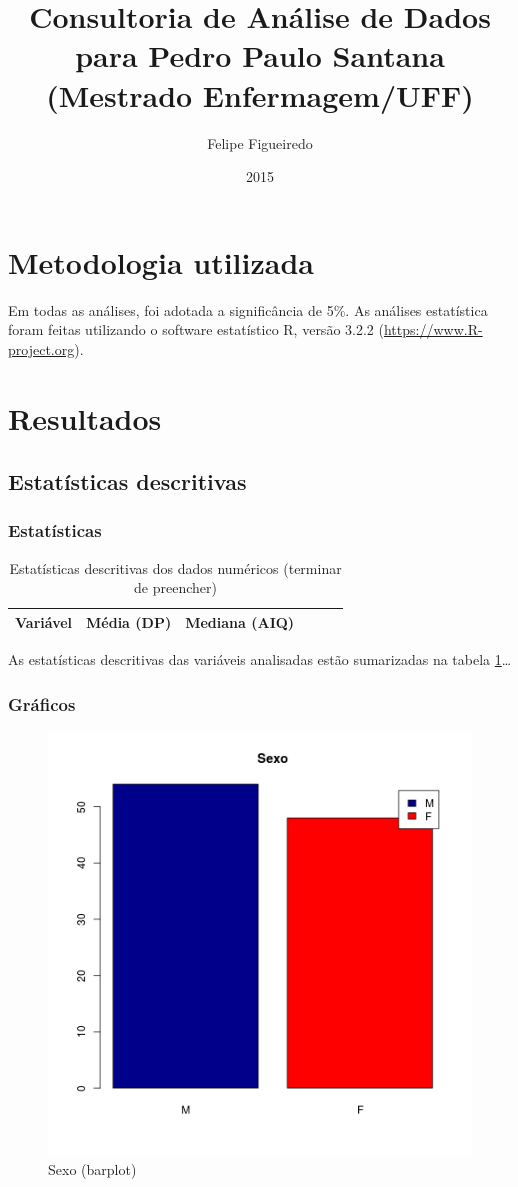 \documentclass[a4paper]{article}
\author{Felipe Figueiredo}
\title{Consultoria de Análise de Dados para Pedro Paulo Santana (Mestrado Enfermagem/UFF)}
\date{2015}
\begin{document}
\maketitle
\newpage
\tableofcontents
\listoffigures
\listoftables
\newpage
\section{Metodologia utilizada}

Em todas as análises, foi adotada a  significância de 5\%. As análises estatística foram feitas utilizando o software estatístico R, versão 3.2.2 (\url{https://www.R-project.org}).

\newpage
\section{Resultados}

\subsection{Estatísticas descritivas}

\subsubsection{Estatísticas}

\begin{table}[!h]
  \centering
  \begin{tabular}{c|ccccc}
    \hline
    Variável& Média (DP) &Mediana (AIQ)&&&\\
    \hline
    \hline
    \hline
  \end{tabular}
  \caption[Estatísticas descritivas dos dados numéricos]{Estatísticas descritivas dos dados numéricos (terminar de preencher)}
  \label{tab:descritivas}
\end{table}

As estatísticas descritivas das variáveis analisadas estão sumarizadas na tabela \ref{tab:descritivas}\ldots

\subsubsection{Gráficos}


\begin{figure}[!h]
  \centering
  \includegraphics[width=.5\textwidth]{../figuras/sexo-bp}
  \caption{Sexo (barplot)}
  \label{fig:}
\end{figure}
\end{document}
